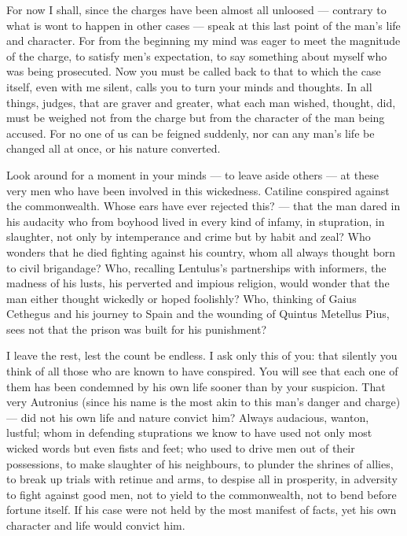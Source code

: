  For now I shall, since the charges have been almost all unloosed --- contrary to what is wont to happen in other cases --- speak at this last point of the man's life and character. For from the beginning my mind was eager to meet the magnitude of the charge, to satisfy men's expectation, to say something about myself who was being prosecuted. Now you must be called back to that to which the case itself, even with me silent, calls you to turn your minds and thoughts. In all things, judges, that are graver and greater, what each man wished, thought, did, must be weighed not from the charge but from the character of the man being accused. For no one of us can be feigned suddenly, nor can any man's life be changed all at once, or his nature converted.

 Look around for a moment in your minds --- to leave aside others --- at these very men who have been involved in this wickedness. Catiline conspired against the commonwealth. Whose ears have ever rejected this? --- that the man dared in his audacity who from boyhood lived in every kind of infamy, in stupration, in slaughter, not only by intemperance and crime but by habit and zeal? Who wonders that he died fighting against his country, whom all always thought born to civil brigandage? Who, recalling Lentulus's partnerships with informers, the madness of his lusts, his perverted and impious religion, would wonder that the man either thought wickedly or hoped foolishly? Who, thinking of Gaius Cethegus and his journey to Spain and the wounding of Quintus Metellus Pius, sees not that the prison was built for his punishment?

 I leave the rest, lest the count be endless. I ask only this of you: that silently you think of all those who are known to have conspired. You will see that each one of them has been condemned by his own life sooner than by your suspicion. That very Autronius (since his name is the most akin to this man's danger and charge) --- did not his own life and nature convict him? Always audacious, wanton, lustful; whom in defending stuprations we know to have used not only most wicked words but even fists and feet; who used to drive men out of their possessions, to make slaughter of his neighbours, to plunder the shrines of allies, to break up trials with retinue and arms, to despise all in prosperity, in adversity to fight against good men, not to yield to the commonwealth, not to bend before fortune itself. If his case were not held by the most manifest of facts, yet his own character and life would convict him.

